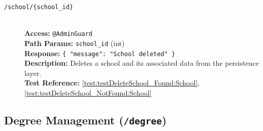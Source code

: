 \begin{description}
	\item[\DELETE \quad \texttt{/school/\{school\_id\}}] \hfill \\
	\textbf{Access:} \texttt{@AdminGuard} \\
	\textbf{Path Params:} \texttt{school\_id} (int) \\
	\textbf{Response:} \texttt{\{ "message": "School deleted" \}} \\
	\textbf{Description:} Deletes a school and its associated data from the persistence layer.\\
	\textbf{Test Reference:} \ref{test:testDeleteSchool_Found:School}, \ref{test:testDeleteSchool_NotFound:School}
\end{description}

\subsection{Degree Management (\texttt{/degree})}
